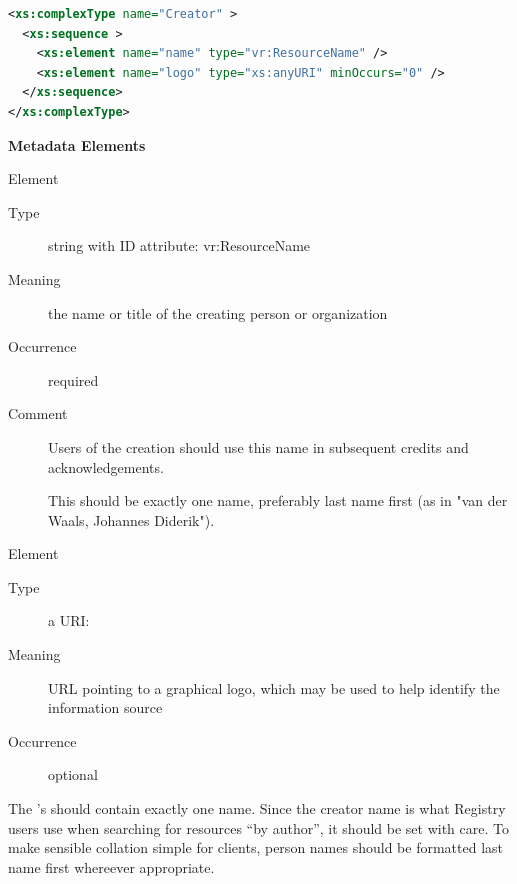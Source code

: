 \documentclass[11pt,a4paper]{ivoa}
\begin{document}
\begin{lstlisting}[language=XML,basicstyle=\footnotesize]
<xs:complexType name="Creator" >
  <xs:sequence >
    <xs:element name="name" type="vr:ResourceName" />
    <xs:element name="logo" type="xs:anyURI" minOccurs="0" />
  </xs:sequence>
</xs:complexType>
\end{lstlisting}

\vspace{0.5ex}\noindent\textbf{ Metadata Elements}

\begingroup\small\begin{bigdescription}\item[Element \xmlel{name}]
\begin{description}
\item[Type] string with ID attribute: vr:ResourceName
\item[Meaning] 
                  the name or title of the creating person or organization
              
\item[Occurrence] required
\item[Comment] 
                  Users of the creation should use this name in
                  subsequent credits and acknowledgements.

                  This should be exactly one name, preferably last name
                  first (as in {"}van der Waals, Johannes Diderik{"}).
              

\end{description}
\item[Element \xmlel{logo}]
\begin{description}
\item[Type] a URI: 
\item[Meaning] 
                URL pointing to a graphical logo, which may be used to help 
                identify the information source
              
\item[Occurrence] optional

\end{description}


\end{bigdescription}\endgroup

\endgroup

The 's  should contain exactly one name.
Since the creator name is what Registry users use when searching for
resources ``by author'', it should be set with care.  To make sensible
collation simple for clients, person names should be formatted last name
first whereever appropriate.
\end{document}
